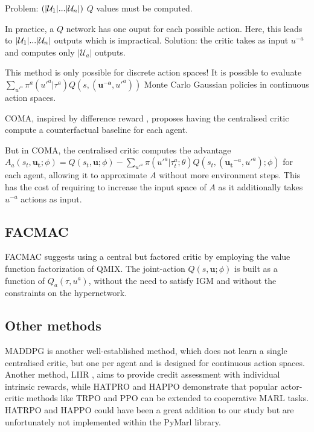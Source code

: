 Problem: $(|\mathcal{U}_1|\*...\*|\mathcal{U}_n|)$ $Q$ values must be computed.

In practice, a $Q$ network has one ouput for each possible action.
Here, this leads to $|\mathcal{U}_1|\*...\*|\mathcal{U}_n|$ outputs which is impractical.
Solution: the critic takes as input $u^{-a}$ and computes only $|\mathcal{U}_a|$ outputs.

This method is only possible for discrete action spaces! 
It is possible to evaluate $\sum_{u'^{a}} \pi^a(u'^{a}|\tau^a) Q(s,(\mathbf{u^{-a}},u'^{a}))$
Monte Carlo 
Gaussian policies in continuous action spaces.


COMA, inspired by difference reward , proposes having the centralised critic compute a counterfactual baseline for each agent.

But in COMA, the centralised critic computes the advantage $A_a(s_t,\boldsymbol{u_t}; \phi)=Q(s_t, \boldsymbol{u};\phi) - \sum_{u'^{a}} \pi({u'^{a}} |\tau_t^a;\theta) Q(s_t, (\boldsymbol{u_t}^{-a}, u'^{a}); \phi)$ for each agent, allowing it to approximate $A$ without more environment steps.
This has the cost of requiring to increase the input space of $A$ as it additionally takes $u^{-a}$ actions as input.

\subsection{FACMAC}

FACMAC suggests using a central but factored critic by employing the value function factorization of QMIX.
The joint-action $Q(s, \boldsymbol{u};\phi)$ is built as a function of $Q_a(\tau, u^a)$, without the need to satisfy IGM and without the constraints on the hypernetwork.


\subsection{Other methods}
MADDPG \citep{lowe2017multi} is another well-established method, which does not learn a single centralised critic, but one per agent and is designed for continuous action spaces.
Another method, LIIR \citep{Du2019LIIRLearning}, aims to provide credit assessment with individual intrinsic rewards, while HATPRO and HAPPO \citep{kuba2021trust} demonstrate that popular actor-critic methods like TRPO \citep{schulman2015trust} and PPO \citep{schulman2017ppo} can be extended to cooperative MARL tasks.
HATRPO and HAPPO could have been a great addition to our study but are unfortunately not implemented within the PyMarl library.

